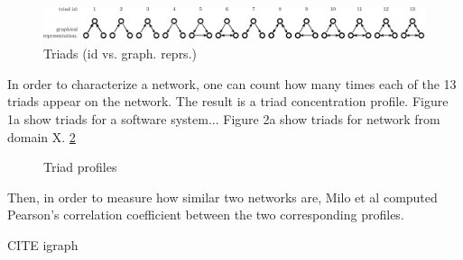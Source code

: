 \begin{figure}[!t]
\centering
\includegraphics[width=1.0\textwidth]{triads}
\caption{Triads (id vs. graph. reprs.)}
\label{fig:triads}
\end{figure}

In order to characterize a network, one can count how many times each of the
13 triads appear on the network. The result is a triad concentration profile.
Figure 1a show triads for a software system... Figure 2a show triads for network
from domain X. \ref{fig:profiles}

\begin{figure}[!t]
\center
{}
\hfil
{}
\caption{Triad profiles}
\label{fig:profiles}
\end{figure}


Then, in order to measure how similar two networks are, Milo et al computed
Pearson's correlation coefficient between the two corresponding profiles.

CITE igraph

